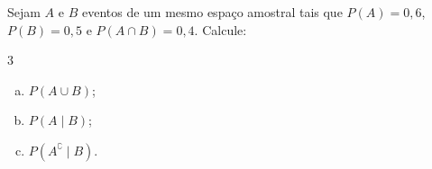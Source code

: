 %
%


\begin{exercicioBanco}[\valorquestao]
Sejam \(A\) e \(B\) eventos de um mesmo espaço amostral tais que \(P(A) = 0{,}6\), \(P(B) = 0{,}5\) e \(P(A \cap B) = 0{,}4\). Calcule:

\begin{multicols}{3}
    \begin{enumerate}[(a)]
        \item \(P(A \cup B)\);
        \item \(P(A \mid B)\);
        \item \(P(A^{\complement} \mid B)\).
    \end{enumerate}
\end{multicols}
%
\end{exercicioBanco}

